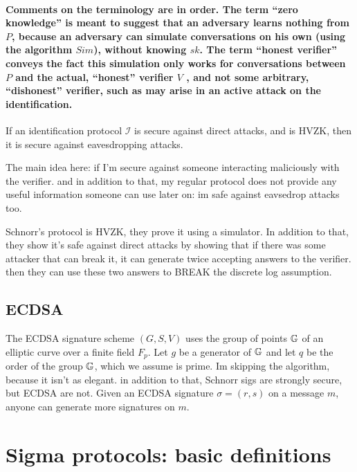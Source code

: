 \paragraph{Comments on the terminology are in order. The term \textquotedblleft zero
knowledge\textquotedblright{} is meant to suggest that an adversary
learns nothing from $P$, because an adversary can simulate conversations
on his own (using the algorithm $Sim$), without knowing $sk$. The
term \textquotedblleft honest verifier\textquotedblright{} conveys
the fact this simulation only works for conversations between $P$
and the actual, \textquotedblleft honest\textquotedblright{} verifier
$V$ , and not some arbitrary, \textquotedblleft dishonest\textquotedblright{}
verifier, such as may arise in an \textbf{active attack} on the identification.}
\begin{thm}
If an identification protocol $\mathcal{I}$ is secure against direct
attacks, and is HVZK, then it is secure against eavesdropping attacks. 
\end{thm}
The main idea here: if I'm secure against someone interacting maliciously with the verifier.
and in addition to that, my regular protocol does not provide any useful information someone
can use later on: im safe against eavsedrop attacks too.

Schnorr's protocol is HVZK, they prove it using a simulator.
In addition to that, they show it's safe against direct attacks by showing that 
if there was some attacker that can break it, it can generate twice accepting answers
to the verifier.
then they can use these two answers to BREAK the discrete log assumption.


\subsection{ECDSA }

The ECDSA signature scheme $(G,S,V)$ uses the group of points $\mathbb{G}$
of an elliptic curve over a finite field $F_{p}$. Let $g$ be a generator
of $\mathbb{G}$ and let $q$ be the order of the group $\mathbb{G}$, which we assume
is prime. Im skipping the algorithm, because it isn't as elegant.
in addition to that, Schnorr sigs are strongly secure, but ECDSA are
not. Given an ECDSA signature $\sigma=\left(r,s\right)$ on a message
$m$, anyone can generate more signatures on $m$.


\section{Sigma protocols: basic definitions }

